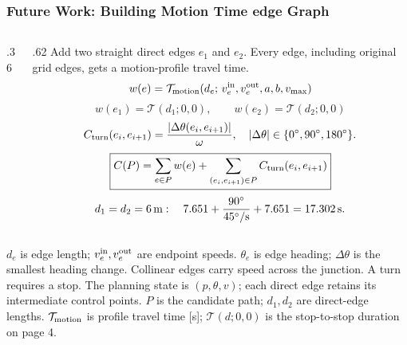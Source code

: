 \begin{frame}
\frametitle{\large Future Work: Building Motion Time edge Graph}
\begin{columns}[T,onlytextwidth]
\begin{column}{.36\textwidth}
\begin{center}


\end{center}
\end{column}
\begin{column}{.62\textwidth}
\footnotesize Add two straight direct edges $e_1$ and $e_2$. Every edge, including original grid edges, gets a motion-profile travel time.
\[
w(e)=\mathcal T_{\rm motion}
       (d_e;\,v_e^{\rm in},v_e^{\rm out},a,b,v_{\max})
\]
\[
w(e_1)=\mathcal T(d_1;0,0),\qquad
w(e_2)=\mathcal T(d_2;0,0)
\]
\[
C_{\rm turn}(e_i,e_{i+1})=
\frac{|\Delta\theta(e_i,e_{i+1})|}{\omega},
\quad |\Delta\theta|\in\{0^\circ,90^\circ,180^\circ\}.
\]
\[
\boxed{C(P)=\sum_{e\in P}w(e)+
\sum_{(e_i,e_{i+1})\in P}C_{\rm turn}(e_i,e_{i+1})}
\]
\[
d_1=d_2=6\,{\rm m}:\quad
7.651+\frac{90^\circ}{45^\circ/{\rm s}}+7.651
=17.302\,{\rm s}.
\]
\end{column}
\end{columns}
\medskip
\footnotesize $d_e$ is edge length; $v_e^{\rm in},v_e^{\rm out}$ are endpoint speeds. $\theta_e$ is edge heading; $\Delta\theta$ is the smallest heading change. Collinear edges carry speed across the junction. A turn requires a stop. The planning state is $(p,\theta,v)$; each direct edge retains its intermediate control points. $P$ is the candidate path; $d_1,d_2$ are direct-edge lengths. $\mathcal T_{\rm motion}$ is profile travel time [s]; $\mathcal T(d;0,0)$ is the stop-to-stop duration on page 4.
\end{frame}

